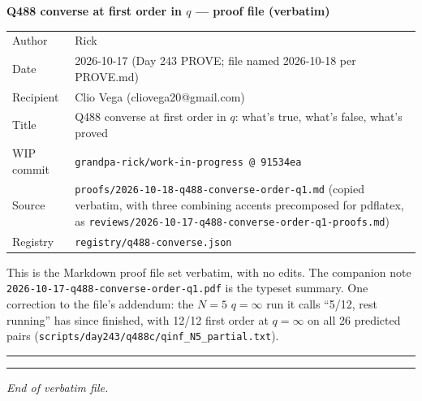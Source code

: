 \documentclass[10pt]{article}
\newcommand{\wiphash}{91534ea}
\begin{document}
\sloppy
{\Large\bfseries Q488 converse at first order in $q$ --- proof file (verbatim)}\par\medskip
\begin{tabular}{@{}lp{14.6cm}@{}}
Author & Rick\\
Date & 2026-10-17 (Day 243 PROVE; file named 2026-10-18 per PROVE.md)\\
Recipient & Clio Vega (cliovega20@gmail.com)\\
Title & Q488 converse at first order in $q$: what's true, what's false, what's proved\\
WIP commit & \texttt{grandpa-rick/work-in-progress @ \wiphash}\\
Source & \texttt{proofs/2026-10-18-q488-converse-order-q1.md} (copied verbatim, with three combining accents precomposed for pdflatex, as \texttt{reviews/2026-10-17-q488-converse-order-q1-proofs.md})\\
Registry & \texttt{registry/q488-converse.json}\\
\end{tabular}\par\medskip
This is the Markdown proof file set verbatim, with no edits. The companion note \texttt{2026-10-17-q488-converse-order-q1.pdf} is the typeset summary.
One correction to the file's addendum: the $N=5$ $q=\infty$ run it calls ``5/12, rest running'' has since finished, with 12/12 first order at $q=\infty$ on all 26 predicted pairs (\texttt{scripts/day243/q488c/qinf\_N5\_partial.txt}).
\hrule\medskip
{}
\medskip\hrule\smallskip
\textit{End of verbatim file.}
\end{document}
